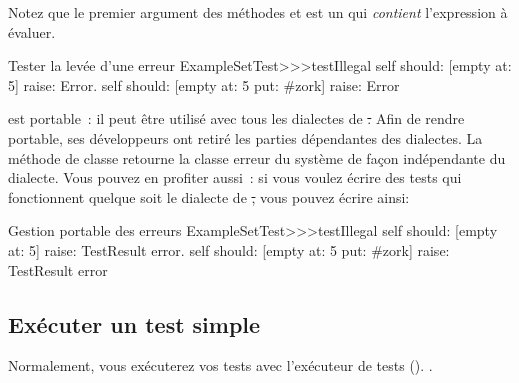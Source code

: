 \documentclass[a4paper,10pt,twoside]{book}
\begin{document}

Notez que le premier argument des méthodes  et  est 
un  qui \emph{contient}
l'expression à évaluer.
 

\begin{method}[ESTtestIllegal]{Tester la levée d'une erreur}
ExampleSetTest>>>testIllegal
	self should: [empty at: 5] raise: Error.
	self should: [empty at: 5 put: #zork] raise: Error
\end{method}

\sunit est portable~: il peut être utilisé avec tous les dialectes de \st. Afin de rendre \sunit portable, ses développeurs ont retiré les parties dépendantes des dialectes. La méthode de classe  retourne la classe erreur du système de façon indépendante du dialecte. Vous pouvez en profiter aussi~: si vous voulez écrire des tests qui fonctionnent quelque soit le dialecte de \st, vous pouvez écrire  ainsi:


\begin{method}[portabletestillegal]{Gestion portable des erreurs}
ExampleSetTest>>>testIllegal
	self should: [empty at: 5] raise: TestResult error.
	self should: [empty at: 5 put: #zork] raise: TestResult error
\end{method}


\subsection{Exécuter un test simple}
Normalement, vous exécuterez vos tests avec l'exécuteur de tests
().
  . %
\end{document}
